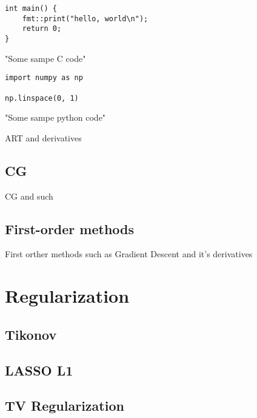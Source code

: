\begin{listing}
	\begin{verbatim}
int main() {
    fmt::print("hello, world\n");
    return 0;
}
    \end{verbatim}
	\caption{"Some sampe C code"}
\end{listing}
\begin{listing}
	\begin{verbatim}
import numpy as np

np.linspace(0, 1)
    \end{verbatim}
	\caption{"Some sampe python code"}
\end{listing}

ART and derivatives

\subsection{CG}\label{subsec:conjuage_gradient}

CG and such

\subsection{First-order methods}\label{subsec:first_order_methods}

First orther methods such as Gradient Descent and it's derivatives

\section{Regularization}\label{sec:regularization}

\subsection{Tikonov}\label{subsec:tikhonov_regularization}

\subsection{LASSO L1}\label{subsec:l1_regularization}

\subsection{TV Regularization}\label{subsec:tv_regularization}
